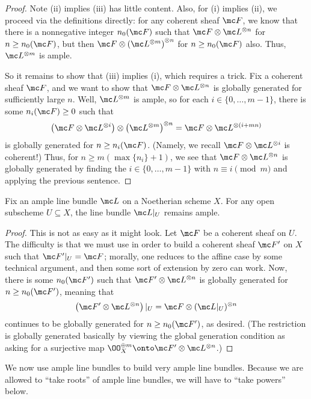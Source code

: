 \documentclass[../notes.tex]{subfiles}
\begin{document}
\begin{proof}
	Note (ii) implies (iii) has little content. Also, for (i) implies (ii), we proceed via the definitions directly: for any coherent sheaf $\mc F$, we know that there is a nonnegative integer $n_0(\mc F)$ such that $\mc F\otimes\mc L^{\otimes n}$ for $n\ge n_0(\mc F)$, but then $\mc F\otimes\left(\mc L^{\otimes m}\right)^{\otimes n}$ for $n\ge n_0(\mc F)$ also. Thus, $\mc L^{\otimes m}$ is ample.

	So it remains to show that (iii) implies (i), which requires a trick. Fix a coherent sheaf $\mc F$, and we want to show that $\mc F\otimes\mc L^{\otimes n}$ is globally generated for sufficiently large $n$. Well, $\mc L^{\otimes m}$ is ample, so for each $i\in\{0,\ldots,m-1\}$, there is some $n_i(\mc F)\ge0$ such that
	\[\left(\mc F\otimes\mc L^{\otimes i}\right)\otimes\left(\mc L^{\otimes m}\right)^{\otimes n}=\mc F\otimes\mc L^{\otimes(i+mn)}\]
	is globally generated for $n\ge n_i(\mc F)$. (Namely, we recall $\mc F\otimes\mc L^{\otimes i}$ is coherent!) Thus, for $n\ge m(\max\{n_i\}+1)$, we see that $\mc F\otimes\mc L^{\otimes n}$ is globally generated by finding the $i\in\{0,\ldots,m-1\}$ with $n\equiv i\pmod m$ and applying the previous sentence.
\end{proof}
\begin{lemma} \label{lem:restrict-ample}
	Fix an ample line bundle $\mc L$ on a Noetherian scheme $X$. For any open subscheme $U\subseteq X$, the line bundle $\mc L|_U$ remains ample.
\end{lemma}
\begin{proof}
	This is not as easy as it might look. Let $\mc F$ be a coherent sheaf on $U$. The difficulty is that we must use \cite[Exercise~II.5.15]{hartshorne} in order to build a coherent sheaf $\mc F'$ on $X$ such that $\mc F'|_U=\mc F$; morally, one reduces to the affine case by some technical argument, and then some sort of extension by zero can work. Now, there is some $n_0(\mc F')$ such that $\mc F'\otimes\mc L^{\otimes n}$ is globally generated for $n\ge n_0(\mc F')$, meaning that
	\[\left(\mc F'\otimes\mc L^{\otimes n}\right)|_U=\mc F\otimes(\mc L|_U)^{\otimes n}\]
	continues to be globally generated for $n\ge n_0(\mc F')$, as desired. (The restriction is globally generated basically by viewing the global generation condition as asking for a surjective map $\OO_X^{\oplus m}\onto\mc F'\otimes\mc L^{\otimes n}$.)
\end{proof}
We now use ample line bundles to build very ample line bundles. Because we are allowed to ``take roots'' of ample line bundles, we will have to ``take powers'' below.
\end{document}
